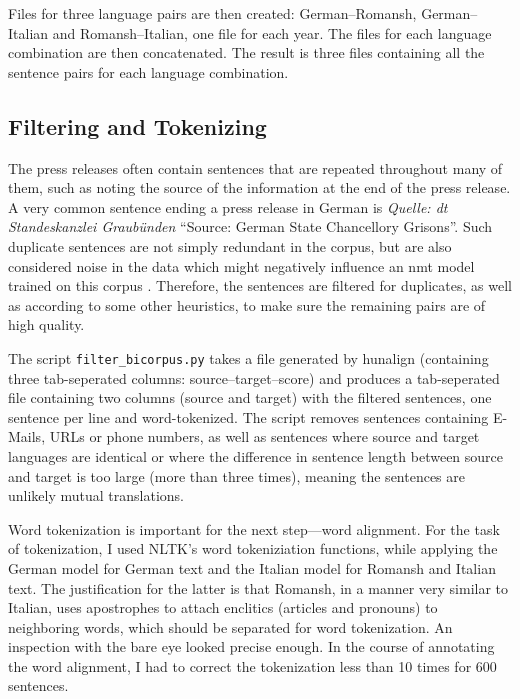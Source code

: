 Files for three language pairs are  then created: German--Romansh, German--Italian and Romansh--Italian, one file for each year. 
The files for each language combination are then concatenated.
The result is three files containing all the sentence pairs for each language combination.

\subsection{Filtering and Tokenizing}
The press releases often contain sentences that are repeated throughout many of them, such as noting the source of the information at the end of the press release. 
A very common sentence ending a press release in German is \emph{Quelle: dt Standeskanzlei Graubünden} \enquote{Source: German State Chancellory Grisons}. 
Such duplicate sentences are not simply redundant in the corpus, but are also considered noise in the data which might negatively influence an \acrshort{nmt} model trained on this corpus \autocite{thompson-koehn-2019-vecalign}. 
Therefore, the sentences are filtered for duplicates, as well as according to some other heuristics, to make sure the remaining pairs are of high quality.

The script \texttt{filter\_bicorpus.py} takes a file generated by hunalign (containing three tab-seperated columns: source--target--score) and produces a tab-seperated file containing two columns (source and target) with the filtered sentences, one sentence per line and word-tokenized. 
The script removes sentences containing E-Mails, URLs or phone numbers, as well as sentences where source and target languages are identical or where the difference in sentence length between source and target is too large (more than three times), meaning the sentences are unlikely mutual translations.

Word tokenization is important for the next step---word alignment. 
For the task of tokenization, I used NLTK's \autocite{bird-2009-nltk} word tokeniziation functions, while applying the German model for German text and the Italian model for Romansh and Italian text. 
The justification for the latter is that Romansh, in a manner very similar to Italian, uses apostrophes to attach enclitics (articles and pronouns) to neighboring words, which should be separated for word tokenization. 
An inspection with the bare eye looked precise enough. 
In the course of annotating the word alignment, I had to correct the tokenization less than 10 times for 600 sentences.


